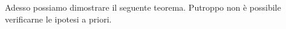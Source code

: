 Adesso possiamo dimostrare il seguente teorema. Putroppo non \`e possibile
verificarne le ipotesi a priori.
